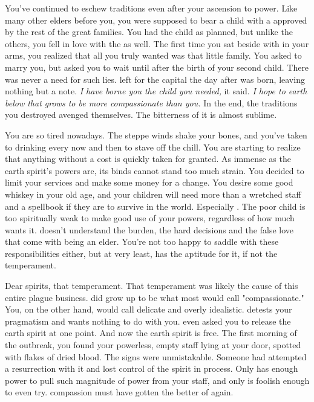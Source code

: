 \documentclass[char]{Pestilence}
\begin{document}
You've continued to eschew traditions even after your ascension to power. Like many other elders before you, you were supposed to bear a child with a \cElderSpouse{\human} approved by the rest of the great families. You had the child as planned, but unlike the others, you fell in love with the \cElderSpouse{\human} as well. The first time you sat beside \cElderSpouse{\intro} with \cApprentice{} in your arms, you realized that all you truly wanted was that little family. You asked \cElderSpouse{\them} to marry you, but \cElderSpouse{\they} asked you to wait until after the birth of your second child. There was never a need for such lies. \cElderSpouse{} left for the capital the day after \cRebel{} was born, leaving nothing but a note. \textit{I have borne you the child you needed,} it said. \textit{I hope to earth below that \cRebel{\they} grows to be more compassionate than you.} In the end, the traditions you destroyed avenged themselves. The bitterness of it is almost sublime.

You are so tired nowadays. The steppe winds shake your bones, and you've taken to drinking every now and then to stave off the chill. You are starting to realize that anything without a cost is quickly taken for granted. As immense as the earth spirit's powers are, its binds cannot stand too much strain. You decided to limit your services and make some money for a change. You desire some good whiskey in your old age, and your children will need more than a wretched staff and a spellbook if they are to survive in the world. Especially \cApprentice{}. The poor child is too spiritually weak to make good use of your powers, regardless of how much \cApprentice{\they} wants it. \cApprentice{\They} doesn't understand the burden, the hard decisions and the false love that come with being an elder. You're not too happy to saddle \cRebel{} with these responsibilities either, but at very least, \cRebel{\they} has the aptitude for it, if not the temperament.

Dear spirits, that temperament. That temperament was likely the cause of this entire plague business. \cRebel{} did grow up to be what most would call "compassionate." You, on the other hand, would call \cRebel{\them} delicate and overly idealistic. \cRebel{} detests your pragmatism and wants nothing to do with you. \cRebel{\They} even asked you to release the earth spirit at one point. And now the earth spirit is free. The first morning of the outbreak, you found your powerless, empty staff lying at your door, spotted with flakes of dried blood. The signs were unmistakable. Someone had attempted a resurrection with it and lost control of the spirit in process. Only \cRebel{} has enough power to pull such magnitude of power from your staff, and only \cRebel{\they} is foolish enough to even try. \cRebel{\Their} compassion must have gotten the better of \cRebel{\them} again. 
\end{document}
